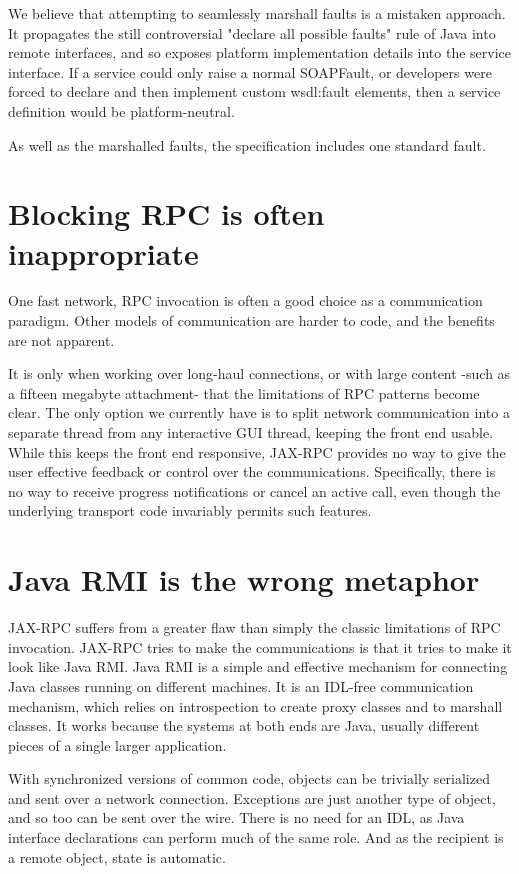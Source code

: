 \documentclass[draft]{article}
\begin{document}
We believe that attempting to seamlessly marshall faults is a mistaken approach.
It propagates the still controversial "declare all possible faults" rule of Java
into remote interfaces, and so exposes platform implementation details into the
service interface. If a service could only raise a normal SOAPFault, or
developers were forced to declare and then implement custom wsdl:fault elements,
then a service definition would be platform-neutral. 

As well as the marshalled faults, the specification includes one
standard fault. 

\section{Blocking RPC is often inappropriate}

One fast network, RPC invocation is often a good choice as a
communication paradigm. Other models of communication are harder to
code, and the benefits are not apparent. 

It is only when working over long-haul connections, or with large
content -such as a fifteen megabyte attachment- that the limitations of
RPC patterns become clear. The only option we currently have is
to split network communication into a separate thread from any
interactive GUI thread, keeping the front end usable. While this keeps 
the front end responsive, JAX-RPC provides no way to give the user
effective feedback or control over the communications. Specifically,  
there is no way to receive
progress notifications or cancel an active call, even though the underlying 
transport code invariably permits such features. 


\section{Java RMI is the wrong metaphor}

JAX-RPC suffers from a greater flaw than simply the classic limitations
of RPC invocation. JAX-RPC tries to make the communications is
that it tries to make it look like Java RMI. Java RMI is a simple and effective
mechanism for connecting Java classes running on different machines. It is an
IDL-free communication mechanism, which relies on introspection to create proxy
classes and to marshall classes. It works because the systems at both ends are
Java, usually different pieces of a single larger application. 

With synchronized versions of common code, objects can be trivially
serialized and sent over a network connection. Exceptions are just
another type of object, and so too can be sent over the wire. There is
no need for an IDL, as Java interface declarations can perform much of
the same role. And as the recipient is a remote object, state is
automatic.
\end{document}
